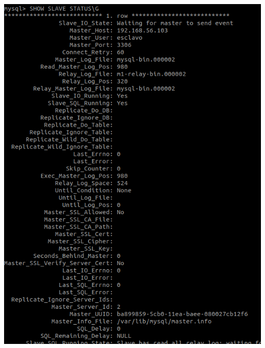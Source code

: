 \documentclass[12pt]{article}
\begin{document}
\begin{center}
\includegraphics[scale=0.35]{26.png}
\end{center}
\end{document}
